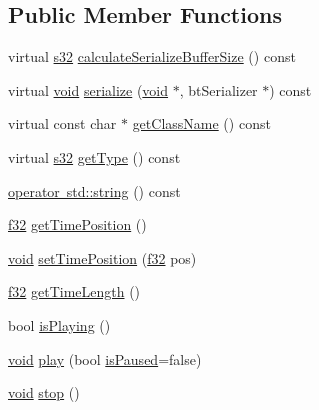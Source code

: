 \subsection*{Public Member Functions}
\begin{DoxyCompactItemize}
\item 
virtual \mbox{\hyperlink{_util_8h_aa62c75d314a0d1f37f79c4b73b2292e2}{s32}} \mbox{\hyperlink{classnjli_1_1_sound_a69f1dd0a3f2bb6c9679d234690370646}{calculate\+Serialize\+Buffer\+Size}} () const
\item 
virtual \mbox{\hyperlink{_thread_8h_af1e856da2e658414cb2456cb6f7ebc66}{void}} \mbox{\hyperlink{classnjli_1_1_sound_ad89767bc3d47d55be5c47691d8f07e9f}{serialize}} (\mbox{\hyperlink{_thread_8h_af1e856da2e658414cb2456cb6f7ebc66}{void}} $\ast$, bt\+Serializer $\ast$) const
\item 
virtual const char $\ast$ \mbox{\hyperlink{classnjli_1_1_sound_ac88b2973a00fe0e9859022de01380be6}{get\+Class\+Name}} () const
\item 
virtual \mbox{\hyperlink{_util_8h_aa62c75d314a0d1f37f79c4b73b2292e2}{s32}} \mbox{\hyperlink{classnjli_1_1_sound_a4eb1275fcde09dd0bbefd6950fdd8fbd}{get\+Type}} () const
\item 
\mbox{\hyperlink{classnjli_1_1_sound_af27e59803f8b7136d71375cfb51620ac}{operator std\+::string}} () const
\item 
\mbox{\hyperlink{_util_8h_a5f6906312a689f27d70e9d086649d3fd}{f32}} \mbox{\hyperlink{classnjli_1_1_sound_ab901d2259a11d7fcfb81703bdd123f67}{get\+Time\+Position}} ()
\item 
\mbox{\hyperlink{_thread_8h_af1e856da2e658414cb2456cb6f7ebc66}{void}} \mbox{\hyperlink{classnjli_1_1_sound_ab47ad411b9f9cc12b39ddd20080293e1}{set\+Time\+Position}} (\mbox{\hyperlink{_util_8h_a5f6906312a689f27d70e9d086649d3fd}{f32}} pos)
\item 
\mbox{\hyperlink{_util_8h_a5f6906312a689f27d70e9d086649d3fd}{f32}} \mbox{\hyperlink{classnjli_1_1_sound_a310e49f228af60ce97e14fc1b6a448a0}{get\+Time\+Length}} ()
\item 
bool \mbox{\hyperlink{classnjli_1_1_sound_a24d6a4011b3148bf41801ad68350d14b}{is\+Playing}} ()
\item 
\mbox{\hyperlink{_thread_8h_af1e856da2e658414cb2456cb6f7ebc66}{void}} \mbox{\hyperlink{classnjli_1_1_sound_aad31814ddad91970ae4418da96035b8a}{play}} (bool \mbox{\hyperlink{classnjli_1_1_sound_a78cf20388060b6be413aadc5967193c4}{is\+Paused}}=false)
\item 
\mbox{\hyperlink{_thread_8h_af1e856da2e658414cb2456cb6f7ebc66}{void}} \mbox{\hyperlink{classnjli_1_1_sound_ab1bcced722c234e1f1e243ef2c0fec33}{stop}} ()

\end{DoxyCompactItemize}
